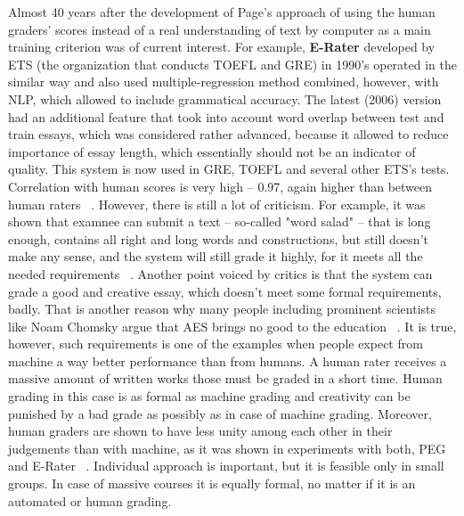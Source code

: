 \documentclass[11pt]{report}
\numberwithin{equation}{section} %
\begin{document}
Almost 40 years after the development of Page's approach of using the human graders' scores instead of a real understanding of text by computer as a main training criterion was of current interest. For example, \textbf{E-Rater} developed by ETS (the organization that conducts TOEFL and GRE) in 1990's operated in the similar way and also used multiple-regression method combined, however, with NLP, which allowed to include grammatical accuracy. The latest (2006) version had an additional feature that took into account word overlap between test and train essays, which was considered rather advanced, because it allowed to reduce importance of essay length, which essentially should not be an indicator of quality. This system is now used in GRE, TOEFL and several other ETS's tests. Correlation with human scores is very high -- 0.97, again higher than between human raters ~\cite{Blood}. However, there is still a lot of criticism. For example, it was shown that examnee can submit a text -- so-called "word salad" -- that is long enough, contains all right and long words and constructions, but still doesn't make any sense, and the system will still grade it highly, for it meets all the needed requirements ~\cite{Hearst}. Another point voiced by critics is that the system can grade a good and creative essay, which doesn't meet some formal requirements, badly. That is another reason why many people including prominent scientists like Noam Chomsky argue that AES brings no good to the education ~\cite{petition}. It is true, however, such requirements is one of the examples when people expect from machine a way better performance than from humans. A human rater receives a massive amount of written works those must be graded in a short time. Human grading in this case is as formal as machine grading and creativity can be punished by a bad grade as possibly as in case of machine grading. Moreover, human graders are shown to have less unity among each other in their judgements than with machine, as it was shown in experiments with both, PEG and E-Rater ~\cite{Blood}. Individual approach is important, but it is feasible only in small groups. In case of massive courses it is equally formal, no matter if it is an automated or human grading.\\
\end{document}
